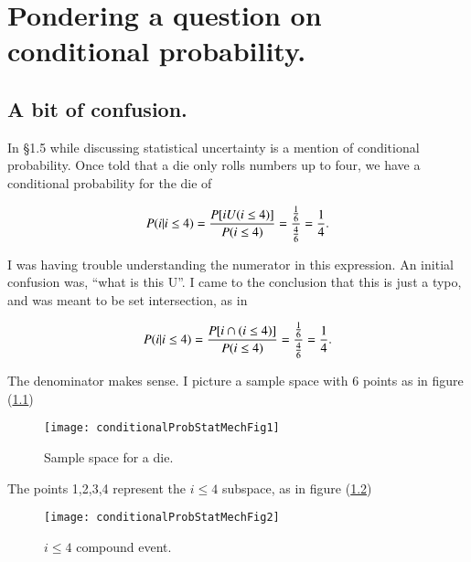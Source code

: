 %
%

\chapter{Pondering a question on conditional probability.}
\label{chap:conditionalProbStatMech}
{}
\date{Dec 27, 2011}

\beginArtNoToc

\section{A bit of confusion.}

In \cite{jackson2000equilibrium} \S 1.5 while discussing statistical uncertainty is a mention of conditional probability.  Once told that a die only rolls numbers up to four, we have a conditional probability for the die of

\begin{equation}\label{eqn:conditionalProbStatMech:10}
P(i | i \le 4) = 
\frac{P[i U(i \le 4)]}{P(i \le 4)}
= \frac{\frac{1}{6}}{\frac{4}{6}} = \frac{1}{4}.
\end{equation}

I was having trouble understanding the numerator in this expression.  An initial confusion was, ``what is this U''.  I came to the conclusion that this is just a typo, and was meant to be set intersection, as in

\begin{equation}\label{eqn:conditionalProbStatMech:30}
P(i | i \le 4) = 
\frac{P[i \cap (i \le 4)]}{P(i \le 4)}
= \frac{\frac{1}{6}}{\frac{4}{6}} = \frac{1}{4}.
\end{equation}

The denominator makes sense.  I picture a sample space with 6 points as in figure (\ref{fig:conditionalProbStatMechalProbStatMechFig1})
\begin{figure}[htp]
   \centering
   \texttt{[image: conditionalProbStatMechFig1]}
   \caption{Sample space for a die.}\label{fig:conditionalProbStatMechalProbStatMechFig1}
\end{figure}

The points 1,2,3,4 represent the $i \le 4$ subspace, as in figure (\ref{fig:conditionalProbStatMechalProbStatMechFig2})
\begin{figure}[htp]
   \centering
   \texttt{[image: conditionalProbStatMechFig2]}
   \caption{$i \le 4$ compound event.}\label{fig:conditionalProbStatMechalProbStatMechFig2}
\end{figure}

